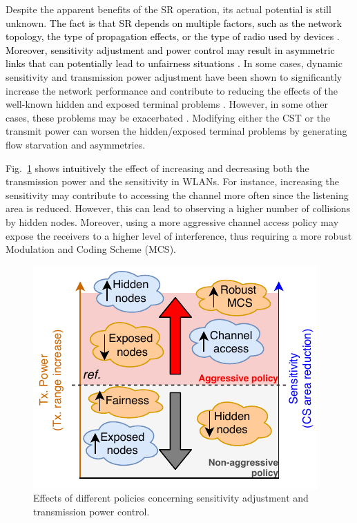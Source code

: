 \documentclass{ieeeaccess}
\begin{document}
Despite the apparent benefits of the SR operation, its actual potential is still unknown. \textcolor{black}{The fact is that SR depends on multiple factors, such as the network topology, the type of propagation effects, or the type of radio used by devices \cite{guo2003spatial, zhu2004adapting}. Moreover, sensitivity adjustment and power control may result in asymmetric links that can potentially lead to unfairness situations \cite{mhatre2007interference}.} In some cases, dynamic sensitivity and transmission power adjustment have been shown to significantly increase the network performance and contribute to reducing the effects of the well-known hidden and exposed terminal problems \cite{zhou2005balancing}. However, in some other cases, these problems may be exacerbated \cite{wilhelmi2019potential}. Modifying either the CST or the transmit power can worsen the hidden/exposed terminal problems by generating flow starvation and asymmetries.

Fig.~\ref{fig:policies_sr} shows \textcolor{black}{intuitively} the effect of increasing and decreasing both the transmission power and the sensitivity in WLANs. For instance, increasing the sensitivity may contribute to accessing the channel more often since the listening area is reduced. However, this can lead to observing a higher number of collisions by hidden nodes. Moreover, using a more aggressive channel access policy may expose the receivers to a higher level of interference, thus requiring a more robust Modulation and Coding Scheme (MCS).
\begin{figure}[ht!]
	\centering
	\includegraphics[width=0.8\columnwidth]{policies_sr}
	\caption{Effects of different policies concerning sensitivity adjustment and transmission power control.}
	\label{fig:policies_sr}
\end{figure}
\end{document}
